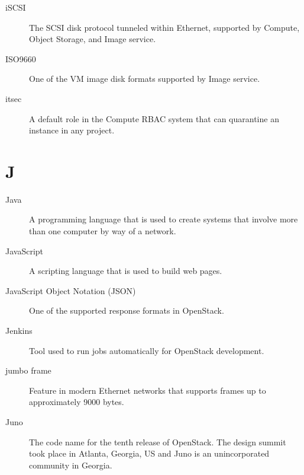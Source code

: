 \documentclass[letterpaper,10pt,english]{sphinxmanual}
\begin{document}
\begin{description}
\item[{iSCSI}] \leavevmode{}\label{_source/glossary:term-iscsi}
The SCSI disk protocol tunneled within Ethernet, supported by
Compute, Object Storage, and Image service.

\item[{ISO9660}] \leavevmode{}\label{_source/glossary:term-iso9660}
One of the VM image disk formats supported by Image
service.

\item[{itsec}] \leavevmode{}\label{_source/glossary:term-itsec}
A default role in the Compute RBAC system that can quarantine an
instance in any project.

\end{description}


\section{J}
\label{_source/glossary:j}\begin{description}
\item[{Java}] \leavevmode{}\label{_source/glossary:term-java}
A programming language that is used to create systems that
involve more than one computer by way of a network.

\item[{JavaScript}] \leavevmode{}\label{_source/glossary:term-javascript}
A scripting language that is used to build web pages.

\item[{JavaScript Object Notation (JSON)}] \leavevmode{}\label{_source/glossary:term-javascript-object-notation-json}
One of the supported response formats in OpenStack.

\item[{Jenkins}] \leavevmode{}\label{_source/glossary:term-jenkins}
Tool used to run jobs automatically for OpenStack
development.

\item[{jumbo frame}] \leavevmode{}\label{_source/glossary:term-jumbo-frame}
Feature in modern Ethernet networks that supports frames up to
approximately 9000 bytes.

\item[{Juno}] \leavevmode{}\label{_source/glossary:term-juno}
The code name for the tenth release of OpenStack. The
design summit took place in Atlanta, Georgia, US and Juno is
an unincorporated community in Georgia.

\end{description}
\end{document}
